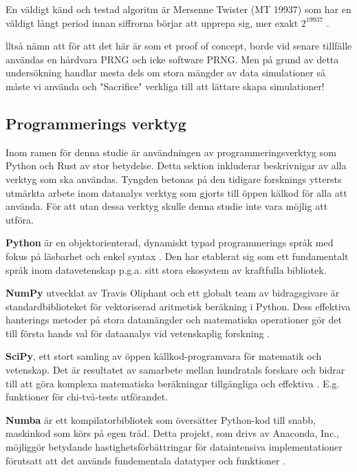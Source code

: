 \documentclass[swedish,a4paper]{article}
\begin{document}
En väldigt känd och testad algoritm är Mersenne Twister (MT 19937) som
har en väldigt långt period innan siffrorna börjar att upprepa sig, mer
exakt $2^{19937}$ \parencite{mersenne_twister}.

lltså nämn att för att det här är som et proof of concept, borde vid
senare tillfälle användas en hårdvara PRNG och icke software PRNG.
Men på grund av detta undersökning handlar mesta dels om stora mängder av data
simulationer så måste vi använda och "Sacrifice" verkliga till att lättare
skapa simulationer!

\subsection{Programmerings verktyg}
\label{sec:verktyg}
Inom ramen för denna studie är användningen av programmeringsverktyg som Python
och Rust av stor betydelse. Detta sektion inkluderar beskrivnigar av alla
verktyg som ska användas. Tyngden betonas på den tidigare forsknings yttersts
utmärkta arbete inom datanalys verktyg som gjorts till öppen kälkod  för alla att
använda. För att utan dessa verktyg skulle denna studie inte
vara möjlig att utföra. 

\textbf{Python} är en objektorienterad, dynamiskt typad programmerings
språk med fokus på läsbarhet och enkel syntax \parencite{python}. Den
har etablerat sig som ett fundamentalt språk inom datavetenskap p.g.a. sitt
stora ekosystem av kraftfulla \gls{bibliotek}. 

\textbf{NumPy} utvecklat av Travis Oliphant och ett globalt team av
bidragsgivare är standardbiblioteket för vektoriserad aritmetisk beräkning i
Python. Dess effektiva hanterings metoder på stora datamängder och matematiska
operationer gör det till första hands val för dataanalys vid vetenskaplig
forskning \parencite{numpy}.

\textbf{SciPy}, ett stort samling av öppen källkod-programvara för matematik och
vetenskap. Det är resultatet av samarbete mellan hundratals forskare och bidrar
till att göra komplexa matematiska beräkningar tillgängliga och effektiva
\parencite{scipy}. E.g. funktioner för chi-två-tests utförandet.

\textbf{Numba} är ett kompilatorbibliotek som översätter Python-kod till snabb,
maskinkod som körs på egen tråd. Detta projekt, som drivs av Anaconda, Inc.,
möjliggör betydande hastighetsförbättringar för dataintensiva implementationer 
förutsatt att det används fundementala datatyper och funktioner \parencite{numba}.  
\end{document}
